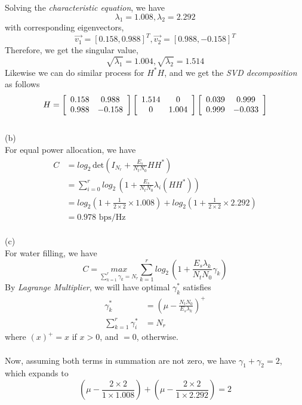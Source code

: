 \documentclass [12pt] {article}
\begin{document}
\begin{spacing}{1.5}
 Solving the \emph{characteristic equation}, we have $$\lambda_1 = 1.008, \lambda_2=2.292 $$ with corresponding eigenvectors, $$\vec{v_1} = [0.158, 0.988]^T, \vec{v_2} = [0.988, -0.158]^T$$
 Therefore, we get the singular value, $$ \sqrt{\lambda_1} = 1.004, \sqrt{\lambda_2} = 1.514 $$
 Likewise we can do similar process for $H^*H$, and we get the \emph{SVD decomposition} as follows
 $$
H = \left[ {\begin{array}{*{20}c}
   0.158 & 0.988  \\
   0.988 & -0.158  \\
 \end{array} } \right]\left[ {\begin{array}{*{20}c}
   1.514 & 0  \\
   0 & 1.004 \\
 \end{array} } \right]
 \left[ {\begin{array}{*{20}c}
   0.039 & 0.999  \\
   0.999 & -0.033  \\
 \end{array} } \right]
$$
~\\
(b)\\
For equal power allocation, we have 
\begin{align*}
C &= log_2 \,\text{det}(I_{N_r} + \frac{E_s}{N_tN_0}H H^*)\\
&= \sum _{i=0}^r log_2 \, (1+\frac{E_s}{N_tN_0}\lambda_i(H H^*))\\
& = log_2(1 + \frac{1}{2\times 2}\times 1.008) + log_2(1+\frac{1}{2\times2}\times 2.292)\\
&= 0.978 \text{ bps/Hz}
\end{align*}
~\\
(c)\\
For water filling, we have
$$ C = \underset{\sum_{k=1}^{r}\gamma_k=N_r}{max}\sum_{k=1}^{r}log_2\,(1+\frac{E_s\lambda_k}{N_tN_0}\gamma_k)$$
By \emph{Lagrange Multiplier}, we will have optimal $\gamma_k^*$ satisfies \\
\begin{align*}
\gamma_k^* &= (\mu - \frac{N_tN_0}{E_s\lambda_k})^+\\
\sum_{k=1}^r \gamma_i^* &= N_r
\end{align*}
where $(x)^+ = x $ if $x >0$, and $= 0$, otherwise.\\
~\\
Now, assuming both terms in summation are not zero, we have $ \gamma_1 + \gamma_2 = 2$, which expands to $$ (\mu - \frac{2\times 2}{1\times 1.008}) + (\mu - \frac{2\times 2}{1\times 2.292}) = 2$$

\end{spacing}
\end{document}
